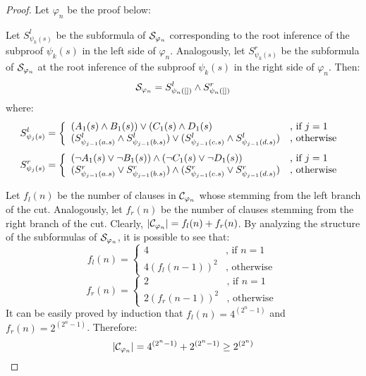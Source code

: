 \begin{proof}
\noindent
Let $\varphi_n$ be the proof below:
\begin{small}
\begin{prooftree}
		 
\end{prooftree}
\end{small}

\noindent
Let $S_{\psi_k(s)}^l$ be the subformula of $\struct{\varphi_n}$ corresponding to the root inference of the subproof $\psi_k(s)$ in the left side of $\varphi_n$. Analogously, let $S_{\psi_k(s)}^r$ be the subformula of $\struct{\varphi_n}$ at the root inference of the subproof $\psi_k(s)$ in the right side of $\varphi_n$. Then:
$$
\struct{\varphi_n} = S_{\psi_n([])}^l \structplus S_{\psi_n([])}^r
$$
%
where:
$$
S_{\psi_j(s)}^l = \left\{ \begin{array}{ll}
(A_1(s) \structplus B_1(s)) \structtimes (C_1(s) \structplus D_1(s) & \textrm{, if } j=1 \\
(S_{\psi_{j-1}(a.s)}^l \structplus S_{\psi_{j-1}(b.s)}^l) \structtimes (S_{\psi_{j-1}(c.s)}^l \structplus S_{\psi_{j-1}(d.s)}^l) & \textrm{, otherwise }
\end{array}\right.
$$
$$
S_{\psi_j(s)}^r = \left\{ \begin{array}{ll}
  (\neg A_1(s) \structtimes \neg B_1(s)) 
  \structplus
  (\neg C_1(s) \structtimes \neg D_1(s))  & \textrm{, if } j=1 \\
  (S_{\psi_{j-1}(a.s)}^r \structtimes S_{\psi_{j-1}(b.s)}^r) 
  \structplus
  (S_{\psi_{j-1}(c.s)}^r \structtimes S_{\psi_{j-1}(d.s)}^r) & \textrm{, otherwise }
\end{array}\right.
$$

\noindent
Let $f_l(n)$ be the number of clauses in $\clauseset{\varphi_n}$ whose stemming from the left branch of the cut. Analogously, let $f_r(n)$ be the number of clauses stemming from the right branch of the cut. Clearly, $|\clauseset{\varphi_n}| = f_l(n) + f_r(n)$. By analyzing the structure of the subformulas of $\struct{\varphi_n}$, it is possible to see that:
$$
f_l(n) = \left\{ \begin{array}{ll}
4 & \textrm{, if } n=1 \\
4 (f_l(n-1))^2 & \textrm{, otherwise }
\end{array}\right.
$$
$$
f_r(n) = \left\{ \begin{array}{ll}
2 & \textrm{, if } n=1 \\
2 (f_r(n-1))^2 & \textrm{, otherwise }
\end{array}\right.
$$
%
It can be easily proved by induction that $f_l(n) = 4^{(2^n - 1)}$ and $f_r(n) = 2^{(2^n - 1)}$. Therefore:
$$
|\clauseset{\varphi_n}| = 4^{(2^n - 1)} + 2^{(2^n - 1)} \geq 2^{(2^n)} 
$$
\hfill\QED
\end{proof}



